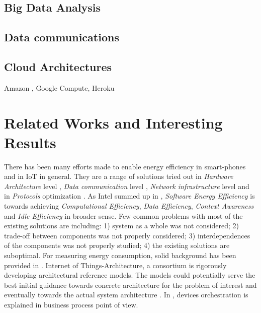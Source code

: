 \subsection{Big Data Analysis}
\subsection{Data communications}
\subsection{Cloud Architectures}
Amazon , Google Compute, Heroku
\section{Related Works and Interesting Results}
There has been many efforts made to enable energy efficiency in smart-phones and in IoT in general. They are a range of solutions tried out in \emph{Hardware Architecture} level \cite{EE:MCCarch,EE:JVM}, \emph{Data communication} level \cite{EE:eTime,EE:Multinets},  \emph{Network infrastructure} level \cite{EE:Hier} and in \emph{Protocols} optimization \cite{EE:Protocol}. As Intel summed up in \cite{EE:GreenSW}, \emph{Software Energy Efficiency} is towards achieving \emph{Computational Efficiency}, \emph{Data Efficiency}, \emph{Context Awareness} and \emph{Idle Efficiency} in broader sense. Few common problems with most of the existing solutions are including: 1) system as a whole was not considered;
2) trade-off between components was not properly considered;
3) interdependences of the components was not properly studied;
4) the existing solutions are suboptimal. For measuring energy consumption, solid background has been provided  in \cite{EE:Measure}. Internet of Things-Architecture, a consortium is rigorously developing architectural reference models. The models could potentially serve the best initial  guidance towards concrete architecture for the problem of interest and eventually towards the actual system architecture \cite{IoTA:ARM}. In \cite{Orches:Arch}, devices orchestration is explained in business process point of view.


